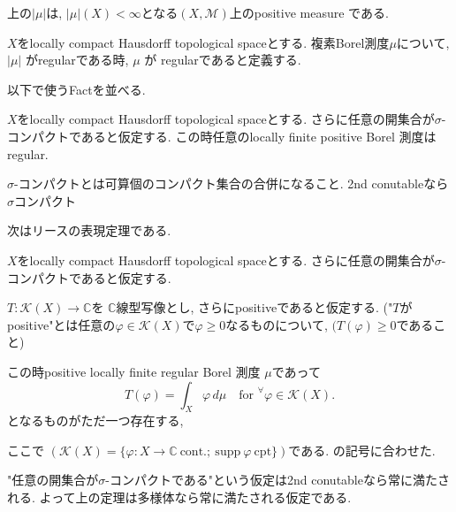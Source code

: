 \begin{tcolorbox}[mybox]
\begin{thm}\cite[Theorem 6.2, 6.4]{Rud2}
\label{thm-M-4.2.9}
上の$|\mu|$は, $|\mu|(X)<\infty$となる$(X,\mathcal{M})$上のpositive measure である. 
\end{thm}
\end{tcolorbox}

\begin{tcolorbox}[mybox]
\begin{defn} 
\label{defn-M-4.2.10}
$X$をlocally compact Hausdorff topological spaceとする. 
複素Borel測度$\mu$について, $|\mu|$ がregularである時, 
$\mu$ が regularであると定義する. 
\end{defn}
\end{tcolorbox}

以下\cite{Rud2}で使うFactを並べる. 
\begin{tcolorbox}[mybox]
\begin{thm}\cite[Theorem 2.18]{Rud2}
\label{thm-M-4.2.11}
$X$をlocally compact Hausdorff topological spaceとする. 
さらに任意の開集合が$\sigma$-コンパクトであると仮定する.
この時任意のlocally finite positive Borel 測度はregular.
\end{thm}
\end{tcolorbox}
$\sigma$-コンパクトとは可算個のコンパクト集合の合併になること. 2nd conutableなら$\sigma$コンパクト

次はリースの表現定理である. 
\begin{tcolorbox}[mybox]
\begin{thm}\cite[Theorem 2.14]{Rud2}
\label{thm-M-4.2.12}
$X$をlocally compact Hausdorff topological spaceとする. 
さらに任意の開集合が$\sigma$-コンパクトであると仮定する.

$T:\mathcal{K}(X)\to \mathbb{C}$を $\mathbb{C}$線型写像とし, さらにpositiveであると仮定する. 
 ("$T$がpositive"とは任意の$ \varphi\in \mathcal{K}(X)$で$\varphi \ge 0$なるものについて, $(T(\varphi)\geq 0 $であること)
 
この時positive locally finite regular Borel 測度 $\mu$であって
\[
T(\varphi)=\int_X \varphi \, d\mu \quad \text{for } {}^\forall \varphi\in \mathcal{K}(X).
\]
となるものがただ一つ存在する, 
\end{thm}
\end{tcolorbox}
ここで
\(
\left( \mathcal{K}(X)=\{\varphi:X\to \mathbb{C}\ \mathrm{cont.};\ \mathrm{supp}\ \varphi\ \mathrm{cpt}\}\right)
\)である. \cite{NO}の記号に合わせた. 


"任意の開集合が$\sigma$-コンパクトである"という仮定は2nd conutableなら常に満たされる.
 よって上の定理は多様体なら常に満たされる仮定である. 


